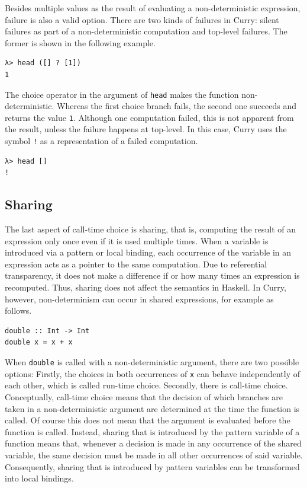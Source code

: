 \documentclass[a4paper, 11pt, fleqn, twoside]{scrreprt}
\newcommand{\hinl}[1]{\texttt{#1}}
\begin{document}
Besides multiple values as the result of evaluating a non-deterministic expression, failure is also a valid option.
There are two kinds of failures in Curry: silent failures as part of a non-deterministic computation and top-level failures.
The former is shown in the following example.

\begin{verbatim}
λ> head ([] ? [1])
1
\end{verbatim}

The choice operator in the argument of \hinl{head} makes the function non-deterministic.
Whereas the first choice branch fails, the second one succeeds and returns the value \hinl{1}.
Although one computation failed, this is not apparent from the result, unless the failure happens at top-level.
In this case, Curry uses the symbol \hinl{!} as a representation of a failed computation.

\begin{verbatim}
λ> head []
!
\end{verbatim}

\subsection{Sharing}
The last aspect of call-time choice is sharing, that is, computing the result of an expression only once even if it is used multiple times.
When a variable is introduced via a pattern or local binding, each occurrence of the variable in an expression acts as a pointer to the same computation.
Due to referential transparency, it does not make a difference if or how many times an expression is recomputed.
Thus, sharing does not affect the semantics in Haskell.
In Curry, however, non-determinism can occur in shared expressions, for example as follows.

\begin{verbatim}
double :: Int -> Int
double x = x + x
\end{verbatim}

When \hinl{double} is called with a non-deterministic argument, there are two possible options: Firstly, the choices in both occurrences of \hinl{x} can behave independently of each other, which is called run-time choice.
Secondly, there is call-time choice.
Conceptually, call-time choice means that the decision of which branches are taken in a non-deterministic argument are determined at the time the function is called.
Of course this does not mean that the argument is evaluated before the function is called.
Instead, sharing that is introduced by the pattern variable of a function means that, whenever a decision is made in any occurrence of the shared variable, the same decision must be made in all other occurrences of said variable.
Consequently, sharing that is introduced by pattern variables can be transformed into local bindings.
\end{document}
